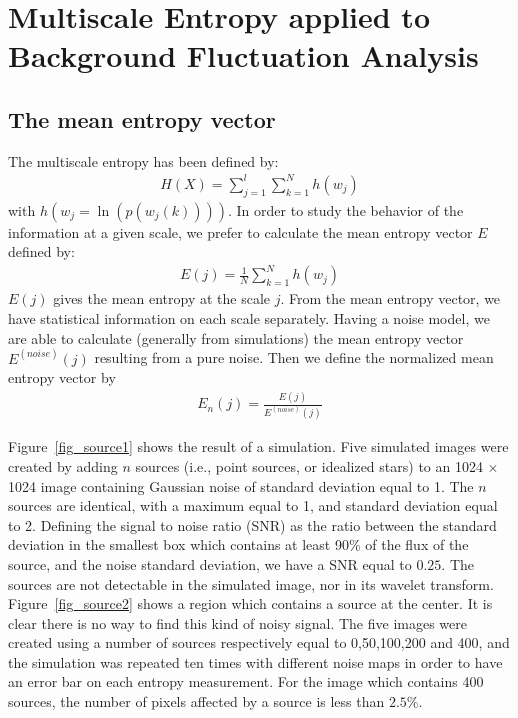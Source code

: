 \chapter{Multiscale Entropy applied to Background Fluctuation Analysis}

\section*{The mean entropy vector}

The multiscale entropy has been defined by:
\begin{eqnarray}
H(X) = \sum_{j=1}^{l}  \sum_{k=1}^{N} h(w_j)  
\end{eqnarray}
with $h(w_j = \ln ( p(w_j(k))))$.
In order to study the behavior of the information at a given scale, we 
prefer to calculate the mean entropy vector $E$ defined by:
\begin{eqnarray}
E(j) = \frac{1}{N}\sum_{k=1}^{N} h(w_j)
\end{eqnarray}
$E(j)$ gives the mean entropy at the scale $j$. From the mean entropy vector,
we have  statistical information on each scale separately. 
Having a noise model, we are able to calculate (generally from simulations)
the mean entropy vector $E^{(noise)}(j)$ resulting from a pure noise.
Then we define the normalized mean entropy vector by
\begin{eqnarray}
E_n(j) = \frac{ E(j) }{ E^{(noise)}(j) }
\end{eqnarray}


Figure~\ref{fig_source1} shows the result of a simulation. 
Five simulated images were created by adding $n$ sources (i.e., point
sources, or idealized stars) to an 1024
$\times$ 1024 image 
containing Gaussian noise of standard deviation equal to 1. The $n$ sources
are identical, with a maximum equal to 1, and standard deviation equal to 2.
Defining the signal to noise ratio (SNR) as the ratio between
the standard deviation in the smallest box which contains at least 90\% 
of the flux of the source, and the noise standard deviation, we have a SNR
equal to $0.25$. The sources  are not detectable in the simulated
image, nor in its wavelet transform. Figure~\ref{fig_source2} shows a region
which contains a source at the center. It is clear there is no way to find
this kind of noisy signal. The five images were created using a number 
of sources
respectively equal to 0,50,100,200 and 400, and the simulation was
repeated ten times with different noise maps in order to have an error bar on
each entropy measurement. For the image which contains 400
sources, the number of pixels affected by a source is less  than $2.5$\%.

